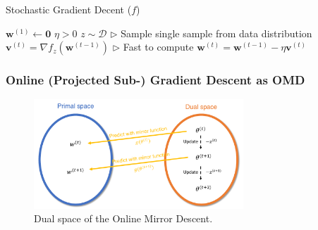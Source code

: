 \documentclass[11pt]{article}
\newcommand{\bw}{\boldsymbol{w}}
\newcommand{\bv}{\boldsymbol{v}}
\begin{document}
\begin{algorithm}[H]
\caption{Stochastic Gradient Decent ($f$)}
\label{algo:sgd}
\begin{algorithmic}[1]
\STATE $\bw^{(1)} \leftarrow \boldsymbol{0}$
\STATE $\eta > 0$
\STATE $z\sim\mathcal{D}$ \hfill $\triangleright$ Sample single sample from data distribution
\STATE $\bv^{(t)} = \nabla f_z(\bw^{(t-1)})$ \hfill $\triangleright$ Fast to compute
\STATE $\bw^{(t)} = \bw^{(t-1)} - \eta\bv^{(t)}$
\ENDFOR
\end{algorithmic}
\end{algorithm}

\subsubsection{Online (Projected Sub-) Gradient Descent as OMD}


\begin{figure}[t]
    \centering
    \includegraphics[width=0.7\textwidth]{Img/dual_space.pdf}
    \caption{Dual space of the Online Mirror Descent.}
    \label{fig:dual_space}
\end{figure}
\end{document}
